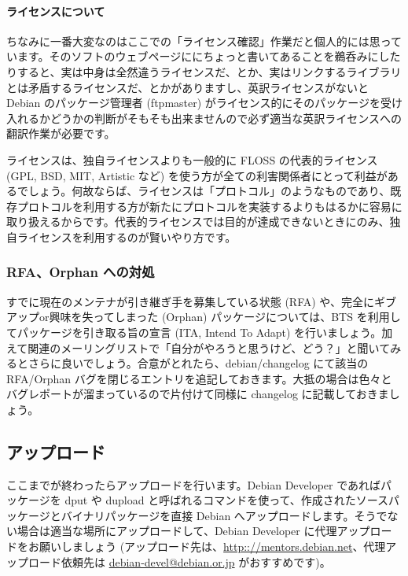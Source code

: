 \documentclass[mingoth,a4paper]{jsarticle}
\begin{document}
\begin{screen}
\paragraph*{ライセンスについて}
ちなみに一番大変なのはここでの「ライセンス確認」作業だと個人的には思っています。そのソフトのウェブページににちょっと書いてあることを鵜呑みにしたりすると、実は中身は全然違うライセンスだ、とか、実はリンクするライブラリとは矛盾するライセンスだ、とかがありますし、英訳ライセンスがないと Debian のパッケージ管理者 (ftpmaster) がライセンス的にそのパッケージを受け入れるかどうかの判断がそもそも出来ませんので必ず適当な英訳ライセンスへの翻訳作業が必要です。

ライセンスは、独自ライセンスよりも一般的に FLOSS の代表的ライセンス (GPL, BSD, MIT, Artistic など) を使う方が全ての利害関係者にとって利益があるでしょう。何故ならば、ライセンスは「プロトコル」のようなものであり、既存プロトコルを利用する方が新たにプロトコルを実装するよりもはるかに容易に取り扱えるからです。代表的ライセンスでは目的が達成できないときにのみ、独自ライセンスを利用するのが賢いやり方です。
\end{screen}

\subsubsection{RFA、Orphan への対処}

すでに現在のメンテナが引き継ぎ手を募集している状態 (RFA) や、完全にギブアップor興味を失ってしまった (Orphan) パッケージについては、BTS を利用してパッケージを引き取る旨の宣言 (ITA, Intend To Adapt) を行いましょう。加えて関連のメーリングリストで「自分がやろうと思うけど、どう？」と聞いてみるとさらに良いでしょう。合意がとれたら、debian/changelog にて該当の RFA/Orphan バグを閉じるエントリを追記しておきます。大抵の場合は色々とバグレポートが溜まっているので片付けて同様に changelog に記載しておきましょう。


\subsection{アップロード}

ここまでが終わったらアップロードを行います。Debian Developer であればパッケージを dput や dupload と呼ばれるコマンドを使って、作成されたソースパッケージとバイナリパッケージを直接 Debian へアップロードします。そうでない場合は適当な場所にアップロードして、Debian Developer に代理アップロードをお願いしましょう (アップロード先は、\url{http:://mentors.debian.net}、代理アップロード依頼先は \url{debian-devel@debian.or.jp} がおすすめです)。 
\end{document}
